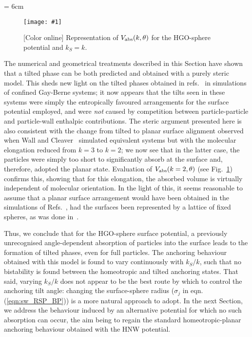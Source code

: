 \documentclass[aps,10pt,twocolumn]{revtex4}
\newlength{\picW}   %
\newcommand{\pic}[1]{\texttt{[image: \#1]}}
\begin{document}
\picW = 6cm
\begin{figure}
    \centering
    \pic{fig_07.ps}
    \caption{[Color online] Representation of $V_{\rm abs}(k,\theta)$ for the HGO-sphere potential and $k_S=k$.}
    \label{fig:Ve_RSP_fk}
\end{figure}

The numerical and geometrical treatments described in this Section have shown that a tilted phase can be both
predicted and obtained with a purely steric model. This sheds new light on the tilted phases obtained in
refs.~\cite{ZhangChakrabarti96, WallCleaver97,TeixeiraChrzanowska01,WebsterCleaver03} in simulations of confined
Gay-Berne systems; it now appears that the tilts seen in these systems were simply the entropically favoured
arrangements for the surface potential employed, and were \emph{not} caused by competition between
particle-particle and particle-wall enthalpic contributions. The steric argument presented here is also consistent
with the change from tilted to planar surface alignment observed when Wall and
Cleaver~\cite{WallCleaver97,WallCleaver03} simulated equivalent systems but with the molecular elongation reduced
from $k=3$ to $k=2$; we now see that in the latter case, the particles were simply too short to significantly
absorb at the surface and, therefore, adopted the planar state. Evaluation of $V_{\rm abs}(k=2,\theta)$ (see
Fig.~\ref{fig:Ve_RSP_fk}) confirms this, showing that for this elongation, the absorbed volume is virtually
independent of molecular orientation. In the light of this, it seems reasonable to assume that a planar surface
arrangement would have been obtained in the simulations of Refs.~\cite{ZhangChakrabarti96,
WallCleaver97,TeixeiraChrzanowska01,WebsterCleaver03}, had the surfaces been represented by a lattice of fixed
spheres, as was done in~\cite{PalermoBiscarini98}.

Thus, we conclude that for the HGO-sphere surface potential, a previously unrecognised angle-dependent absorption
of particles into the surface leads to the formation of tilted phases, even for full particles. The anchoring
behaviour obtained with this model is found to vary continuously with $k_S/k$, such that no bistability is found
between the homeotropic and tilted anchoring states. That said, varying $k_S/k$ does not appear to be the best
route by which to control the anchoring tilt angle: changing the surface-sphere radius ($\sigma_j$ in
eqn.(\ref{eqn:sw_RSP_BP})) is a more natural approach to adopt. In the next Section, we address the behaviour
induced by an alternative potential for which no such absorption can occur, the aim being to regain the standard
homeotropic-planar anchoring behaviour obtained with the HNW potential.
\end{document}
